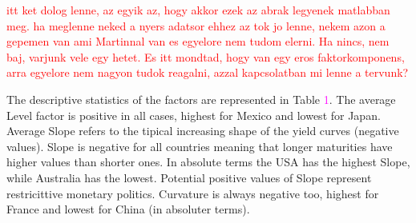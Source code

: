 \documentclass[12pt,bibliography=totoc]{article}
\begin{document}

\textcolor{red}{itt ket dolog lenne, az egyik az, hogy akkor ezek az abrak legyenek matlabban meg. ha meglenne neked a nyers adatsor ehhez az tok jo lenne, nekem azon a gepemen van ami Martinnal van es egyelore nem tudom elerni. Ha nincs, nem baj, varjunk vele egy hetet.
Es itt mondtad, hogy van egy eros faktorkomponens, arra egyelore nem nagyon tudok reagalni, azzal kapcsolatban mi lenne a tervunk?}

The descriptive statistics of the factors are represented in Table \textcolor{magenta}{1}. The average Level factor is positive in all cases, highest for Mexico and lowest for Japan. Average Slope refers to the tipical increasing shape of the yield curves (negative values). Slope is negative for all countries meaning that longer maturities have higher values than shorter ones. In absolute terms the USA has the highest Slope, while Australia has the lowest. Potential positive values of Slope represent restricittive monetary politics. Curvature is always negative too, highest for France and lowest for China (in absoluter terms).
\end{document}

